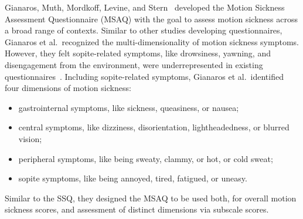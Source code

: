 Gianaros, Muth, Mordkoff, Levine, and Stern~\cite{Gianaros2001} developed the Motion Sickness Assessment
Questionnaire (MSAQ) with the goal to assess motion sickness across a broad range of contexts.
Similar to other studies developing questionnaires, Gianaros et al.\ recognized the multi-dimensionality of motion
sickness symptoms.
However, they felt sopite-related symptoms, like drowsiness, yawning, and disengagement from the environment, were
underrepresented in existing questionnaires~\cite{Gianaros2001,Graybiel1976}.
Including sopite-related symptoms, Gianaros et al.\ identified four dimensions of motion sickness:
\begin{itemize}
    \item gastrointernal symptoms, like sickness, queasiness, or nausea;
    \item central symptoms, like dizziness, disorientation, lightheadedness, or blurred vision;
    \item peripheral symptoms, like being sweaty, clammy, or hot, or cold sweat;
    \item sopite symptoms, like being annoyed, tired, fatigued, or uneasy.
\end{itemize}
Similar to the SSQ, they designed the MSAQ to be used both, for overall motion sickness scores, and assessment of 
distinct dimensions via subscale scores.
